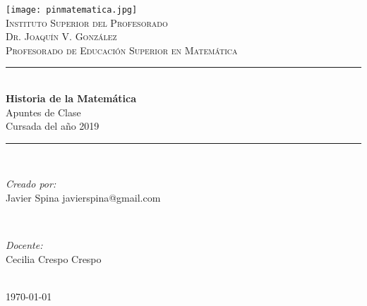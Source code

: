 \documentclass[a4paper,12pt]{article}
\begin{document}
    \newcommand{\HRule}{\rule{\linewidth}{0.5mm}}
    
    
    \begin{titlepage}
        \center

        \texttt{[image: pinmatematica.jpg]}\\[1cm]
        \textsc{\Large Instituto Superior del Profesorado}\\[0.3cm]
        \textsc{\LARGE Dr. Joaquín V. González}\\[1cm]
        \textsc{\large Profesorado de Educación Superior en Matemática}\\[0.5cm]
        
        \HRule \\[0.4cm]
            {\huge \bfseries Historia de la Matemática}\\[0.3cm]
            \Large Apuntes de Clase\\
            \large Cursada del año 2019\\
        \HRule \\[1.5cm]
        
        \begin{minipage}{0.4\textwidth}
            \begin{flushleft} 
                \large
                \emph{Creado por:}\\
                Javier Spina
                javierspina@gmail.com
            \end{flushleft}
        \end{minipage}
        ~
        \begin{minipage}{0.4\textwidth}
            \begin{flushright} 
                \large
                \emph{Docente:}\\
                Cecilia Crespo Crespo
            \end{flushright}
        \end{minipage}\\[3cm]
        
        \vfill
        {\large \today}
        
        \restoregeometry
    \end{titlepage}

\tableofcontents
\pagebreak






\end{document}
